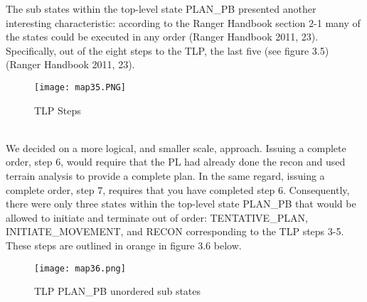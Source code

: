 The sub states within the top-level state PLAN_PB presented another interesting
characteristic: according to the Ranger Handbook section 2-1 many of the states
could be executed in any order (Ranger Handbook 2011, 23). Specifically, out of
the eight steps to the TLP, the last five (see figure 3.5) (Ranger Handbook 2011,
23).\\
\begin{figure}[h]
  \centering
  \texttt{[image: map35.PNG]}
  \caption{TLP Steps}
\end{figure}\\
We decided on a more logical, and smaller scale, approach. Issuing a complete order,
step 6, would require that the PL had already done the recon and used terrain analysis
to provide a complete plan. In the same regard, issuing a complete order, step 7,
requires that you have completed step 6. Consequently, there were only three states
within the top-level state PLAN_PB that would be allowed to initiate and terminate
out of order: TENTATIVE_PLAN, INITIATE_MOVEMENT, and RECON corresponding to the TLP
steps 3-5. These steps are outlined in orange in figure 3.6 below.\\
\begin{figure}[h]
  \centering
  \texttt{[image: map36.png]}
  \caption{TLP PLAN_PB unordered sub states}
\end{figure}\\ \\


